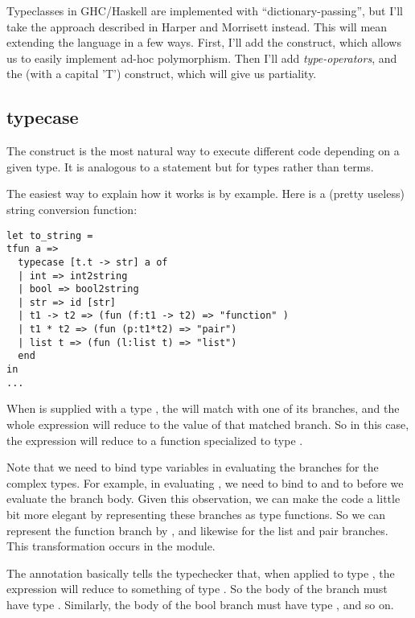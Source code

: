 \documentclass[pageno]{jpaper}
\begin{document}
{{{Typeclasses in GHC/Haskell are implemented with ``dictionary-passing'', but I'll take the approach described
in Harper and Morrisett instead. This will mean extending the language in a few ways.  First, I'll add the
 construct, which allows us to easily implement ad-hoc polymorphism. Then I'll add
\textit{type-operators}, and the  (with a capital 'T') construct, which will give us
partiality.

\subsection{typecase}
The  construct is the most natural way to execute different code depending on a
given type. It is analogous to a  statement but for types rather than terms.

The easiest way to explain how it works is by example. Here is a (pretty useless) string conversion function:

\begin{lstlisting}[mathescape]
let to_string = 
tfun a =>
  typecase [t.t -> str] a of
  | int => int2string
  | bool => bool2string
  | str => id [str]
  | t1 -> t2 => (fun (f:t1 -> t2) => "function" )
  | t1 * t2 => (fun (p:t1*t2) => "pair")
  | list t => (fun (l:list t) => "list")
  end
in
...
\end{lstlisting}

When  is supplied with a type , the  will match 
with one of its branches, and the whole expression will reduce to the value of that matched branch.
So in this case, the expression will reduce to a  function specialized to
type .

Note that we need to bind type variables in evaluating the branches for the complex types. For example,
in evaluating , we need to bind  to  and  to  before we evaluate the branch body. 
Given this observation, we can make the code a little bit more elegant
by representing these branches as type functions. So we can represent the function branch by
, and likewise for the list and pair branches. This transformation
occurs in the  module.

The annotation \lsti{[t.t -> str]} basically tells the typechecker that, when applied to type , the  expression will reduce to something of type . 
So the body of the  branch must have type .
Similarly, the body of the bool branch must have type , and so on.

}}}
\end{document}
